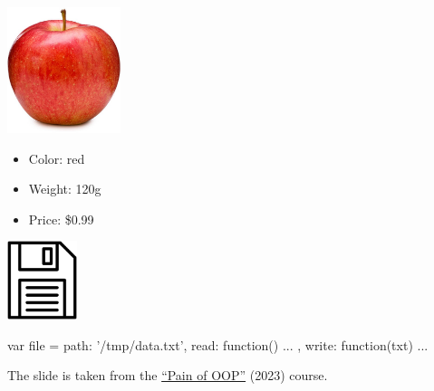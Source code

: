 \documentclass{article}
\begin{document}
\begin{multicols}{2}
\includegraphics[width=1.3in]{apple.jpg}
\begin{itemize}\setlength\itemsep{0em}
\item Color: red
\item Weight: 120g
\item Price: \$0.99
\end{itemize}
\par\columnbreak\par
\includegraphics[width=0.8in]{file-on-disc.jpg}
\par
{\small\begin{ffcode}
var file = {
  path: '/tmp/data.txt',
  read: function() { ... },
  write: function(txt) { ... }
}
\end{ffcode}
}
\end{multicols}
\par
{\scriptsize The slide is taken from the \href{https://github.com/yegor256/painofoop}{``Pain of OOP''} (2023) course.\par}
\plush{}
\end{document}
